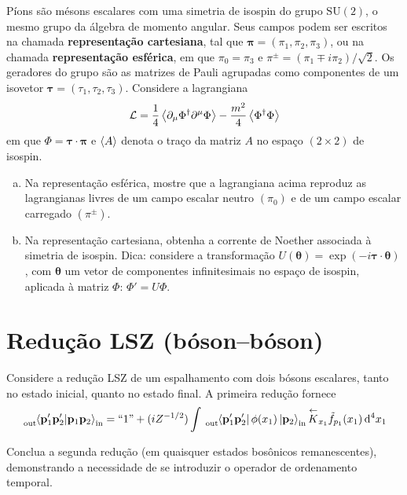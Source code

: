 \documentclass[a4paper, 11pt, oneside]{impression}
\begin{document}
\begin{exercise}{}
    Píons são mésons escalares com uma simetria de isospin do grupo $\text{SU}(2)$, o mesmo grupo da álgebra de momento angular. Seus campos podem ser escritos na chamada \textbf{representação cartesiana}, tal que $\boldsymbol{\pi} = (\pi_{1},\pi_{2},\pi_{3})$, ou na chamada \textbf{representação esférica}, em que $\pi_{0} = \pi_{3}$ e $\pi^{\pm} = (\pi_{1} \mp i\pi_{2})/\sqrt{2}$. Os geradores do grupo são as matrizes de Pauli agrupadas como componentes de um isovetor $\boldsymbol{\tau} = (\tau_{1},\tau_{2},\tau_{3})$. Considere a lagrangiana
        \begin{equation*}
            \mathcal{L} = \dfrac{1}{4}\expval{\partial_{\mu}\Phi^{\dagger}\partial^{\mu}\Phi} - \dfrac{m^2}{4}\expval{\Phi^{\dagger}\Phi}
        \end{equation*}
    em que $\Phi = \boldsymbol{\tau}\cdot\boldsymbol{\pi}$ e $\expval{A}$ denota o traço da matriz $A$ no espaço $(2\times2)$ de isospin.
    \begin{enumerate}[(a)]
        \item Na representação esférica, mostre que a lagrangiana acima reproduz as lagrangianas livres de um campo escalar neutro $(\pi_{0})$ e de um campo escalar carregado $(\pi^{\pm})$.

        \item Na representação cartesiana, obtenha a corrente de Noether associada à simetria de isospin. Dica: considere a transformação $U(\boldsymbol{\theta}) = \exp(-i\boldsymbol{\tau}\cdot\boldsymbol{\theta})$, com $\boldsymbol{\theta}$ um vetor de componentes infinitesimais no espaço de isospin, aplicada à matriz $\Phi$: $\Phi' = U\Phi$.
    \end{enumerate}
\end{exercise}



\newpage

\chapter{Redução LSZ (bóson--bóson)}\label{quest: eight}

\begin{exercise}{}
    Considere a redução LSZ de um espalhamento com dois bósons escalares, tanto no estado inicial, quanto no estado final. A primeira redução fornece
        \begin{equation*}
            \tensor[_{\text{out}}]{\braket{\vb{p}_{1}'\vb{p}_{2}'}{\vb{p}_{1}\vb{p}_{2}}}{_{\text{in}}} = \text{``1''} + (iZ^{-1/2})\int \tensor[_{\text{out}}]{\bra{\vb{p}_{1}'\vb{p}_{2}'}\phi(x_{1})\ket{\vb{p}_{2}}}{_{\text{in}}} \overset{\leftarrow}{K}_{x_{1}} \tilde{f}_{p_{1}}(x_{1}) \dd[4]{x_{1}}
        \end{equation*}

    \noindent Conclua a segunda redução (em quaisquer estados bosônicos remanescentes), demonstrando a necessidade de se introduzir o operador de ordenamento temporal. 
\end{exercise}
\end{document}
